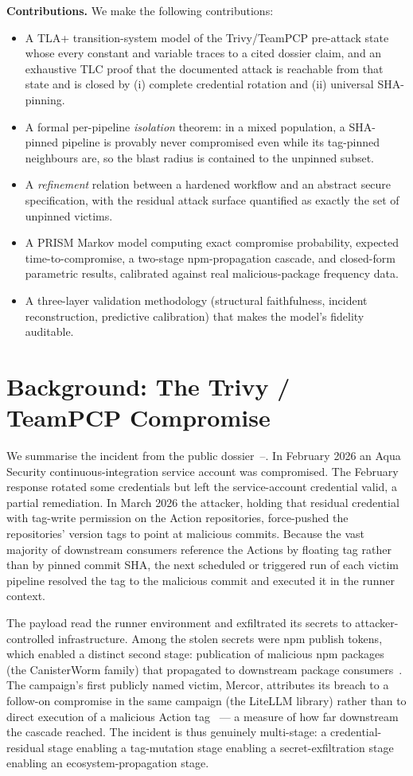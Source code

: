 \documentclass[letterpaper,twocolumn,10pt]{article}
\begin{document}
\noindent\textbf{Contributions.} We make the following contributions:
\begin{itemize}\itemsep2pt \parskip0pt 
  \item A TLA+ transition-system model of the Trivy/TeamPCP pre-attack state whose every constant and variable traces to a cited dossier claim, and an exhaustive TLC proof that the documented attack is reachable from that state and is closed by (i) complete credential rotation and (ii) universal SHA-pinning.
  \item A formal per-pipeline \emph{isolation} theorem: in a mixed population, a SHA-pinned pipeline is provably never compromised even while its tag-pinned neighbours are, so the blast radius is contained to the unpinned subset.
  \item A \emph{refinement} relation between a hardened workflow and an abstract secure specification, with the residual attack surface quantified as exactly the set of unpinned victims.
  \item A PRISM Markov model computing exact compromise probability, expected time-to-compromise, a two-stage npm-propagation cascade, and closed-form parametric results, calibrated against real malicious-package frequency data.
  \item A three-layer validation methodology (structural faithfulness, incident reconstruction, predictive calibration) that makes the model's fidelity auditable.
\end{itemize}

\section{Background: The Trivy / TeamPCP Compromise}
We summarise the incident from the public dossier~\cite{aqua}--\cite{cato}. In February 2026 an Aqua Security continuous-integration service account was compromised. The February response rotated some credentials but left the service-account credential valid, a partial remediation. In March 2026 the attacker, holding that residual credential with tag-write permission on the Action repositories, force-pushed the repositories' version tags to point at malicious commits. Because the vast majority of downstream consumers reference the Actions by floating tag rather than by pinned commit SHA, the next scheduled or triggered run of each victim pipeline resolved the tag to the malicious commit and executed it in the runner context.

The payload read the runner environment and exfiltrated its secrets to attacker-controlled infrastructure. Among the stolen secrets were npm publish tokens, which enabled a distinct second stage: publication of malicious npm packages (the CanisterWorm family) that propagated to downstream package consumers~\cite{unit42,rlabs}. The campaign's first publicly named victim, Mercor, attributes its breach to a follow-on compromise in the same campaign (the LiteLLM library) rather than to direct execution of a malicious Action tag~\cite{mercor} --- a measure of how far downstream the cascade reached. The incident is thus genuinely multi-stage: a credential-residual stage enabling a tag-mutation stage enabling a secret-exfiltration stage enabling an ecosystem-propagation stage.
\end{document}
